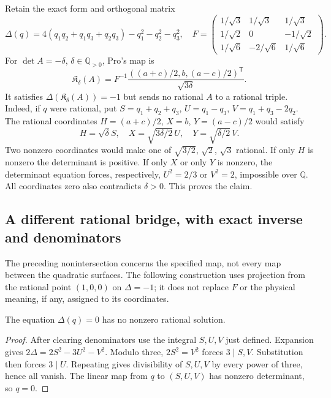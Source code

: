 Retain the exact form and orthogonal matrix
\[
 \Delta(q)=4(q_1q_2+q_1q_3+q_2q_3)-q_1^2-q_2^2-q_3^2,
 \quad
 F=\begin{pmatrix}
 1/\sqrt3&1/\sqrt3&1/\sqrt3\\
 1/\sqrt2&0&-1/\sqrt2\\
 1/\sqrt6&-2/\sqrt6&1/\sqrt6
 \end{pmatrix}.
\]
For $\det A=-\delta$, $\delta\in\mathbb Q_{>0}$, Pro's map is
\[
 \mathfrak K_\delta(A)=F^{-1}
 \frac{((a+c)/2,b,(a-c)/2)^{\mathsf T}}{\sqrt{3\delta}}.
\]
It satisfies $\Delta(\mathfrak K_\delta(A))=-1$ but sends no rational
$A$ to a rational triple. Indeed, if $q$ were rational, put
$S=q_1+q_2+q_3$, $U=q_1-q_3$, $V=q_1+q_3-2q_2$. The rational coordinates
$H=(a+c)/2$, $X=b$, $Y=(a-c)/2$ would satisfy
\[
 H=\sqrt\delta S,\quad X=\sqrt{3\delta/2}\,U,
 \quad Y=\sqrt{\delta/2}\,V.
\]
Two nonzero coordinates would make one of $\sqrt{3/2}$, $\sqrt2$,
$\sqrt3$ rational. If only $H$ is nonzero the determinant is positive.
If only $X$ or only $Y$ is nonzero, the determinant equation forces,
respectively, $U^2=2/3$ or $V^2=2$, impossible over $\mathbb Q$.
All coordinates zero also contradicts $\delta>0$. This proves the claim.

\subsection{A different rational bridge, with exact inverse and denominators}

The preceding nonintersection concerns the specified map, not every map
between the quadratic surfaces. The following construction uses projection
from the rational point $(1,0,0)$ on $\Delta=-1$; it does not replace $F$ or
the physical meaning, if any, assigned to its coordinates.

\begin{lemma}\label{lem:esv3-anisotropic}
The equation $\Delta(q)=0$ has no nonzero rational solution.
\end{lemma}
\begin{proof}
After clearing denominators use the integral $S,U,V$ just defined.
Expansion gives $2\Delta=2S^2-3U^2-V^2$. Modulo three,
$2S^2=V^2$ forces $3\mid S,V$. Substitution then forces $3\mid U$.
Repeating gives divisibility of $S,U,V$ by every power of three, hence all
vanish. The linear map from $q$ to $(S,U,V)$ has nonzero determinant,
so $q=0$.
\end{proof}

